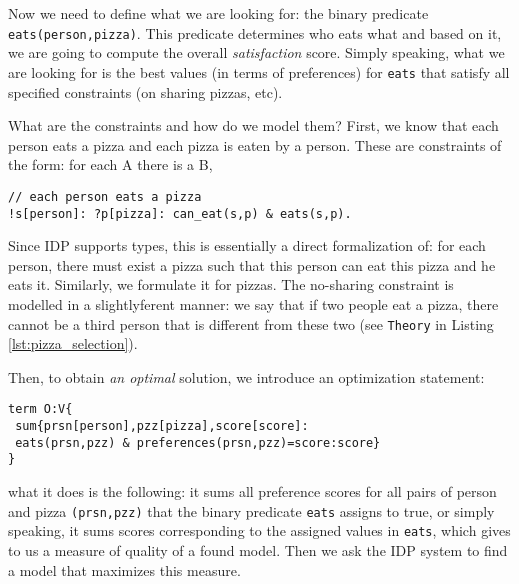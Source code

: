 Now we need to define what we are looking for: the binary predicate \texttt{eats(person,pizza)}. This predicate determines who eats what and based on it, we are going to compute the overall \textit{satisfaction} score. Simply speaking, what we are looking for is the best values (in terms of preferences) for \texttt{eats} that satisfy all specified constraints (on sharing pizzas, etc).

What are the constraints and how do we model them? First, we know that each person eats a pizza and each pizza is eaten by a person. These are constraints of the form: for each A there is a B,
\begin{verbatim}
// each person eats a pizza 
!s[person]: ?p[pizza]: can_eat(s,p) & eats(s,p). 
\end{verbatim}
Since IDP supports types, this is essentially a direct formalization of: for each person, there must exist a pizza such that this person can eat this pizza and he eats it. Similarly, we formulate it for pizzas. The no-sharing constraint is modelled in a slightlyferent manner: we say that if two people eat a pizza, there cannot be a third person that is different from these two (see \texttt{Theory} in Listing \ref{lst:pizza_selection}).

Then, to obtain \textit{an optimal} solution, we introduce an optimization statement:
\begin{verbatim}
term O:V{
 sum{prsn[person],pzz[pizza],score[score]: 
 eats(prsn,pzz) & preferences(prsn,pzz)=score:score}
}
\end{verbatim}
what it does is the following: it sums all preference scores for all pairs of person and pizza \texttt{(prsn,pzz)} that the binary predicate \texttt{eats} assigns to true, or simply speaking, it sums scores corresponding to the assigned values in \texttt{eats}, which gives to us a measure of quality of a found model. Then we ask the IDP system to find a model that maximizes this measure.

